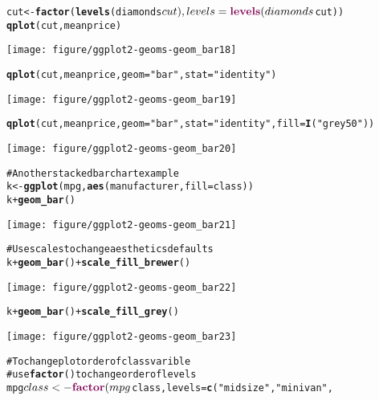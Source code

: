 \documentclass[a4paper,titlepage]{tufte-handout}\usepackage{graphicx, color}
\makeatletter
\def\maxwidth{ %
  \ifdim\Gin@nat@width>\linewidth
    \linewidth
  \else
    \Gin@nat@width
  \fi
}
\newcommand{\hlfunctioncall}[1]{\textcolor[rgb]{0.501960784313725,0,0.329411764705882}{\textbf{#1}}}%
\newcommand{\hlstring}[1]{\textcolor[rgb]{0.6,0.6,1}{#1}}%
\newcommand{\hlcomment}[1]{\textcolor[rgb]{0.180392156862745,0.6,0.341176470588235}{#1}}%
\newenvironment{kframe}{%
 \def\at@end@of@kframe{}%
 \ifinner\ifhmode%
  \def\at@end@of@kframe{\end{minipage}}%
  \begin{minipage}{\columnwidth}%
 \fi\fi%
 \def\FrameCommand##1{\hskip\@totalleftmargin \hskip-\fboxsep
 \colorbox{shadecolor}{##1}\hskip-\fboxsep
     \hskip-\linewidth \hskip-\@totalleftmargin \hskip\columnwidth}%
 \MakeFramed {\advance\hsize-\width
   \@totalleftmargin\z@ \linewidth\hsize
   \@setminipage}}%
 {\par\unskip\endMakeFramed%
 \at@end@of@kframe}
\newenvironment{knitrout}{}{} %
\makeatother
\begin{document}
\begin{knitrout}
\begin{kframe}
\begin{alltt}
cut <- \hlfunctioncall{factor}(\hlfunctioncall{levels}(diamonds$cut), levels = \hlfunctioncall{levels}(diamonds$cut))
\hlfunctioncall{qplot}(cut, meanprice)
\end{alltt}
\end{kframe}\texttt{[image: figure/ggplot2-geoms-geom\_bar18]} \begin{kframe}\begin{alltt}
\hlfunctioncall{qplot}(cut, meanprice, geom=\hlstring{"bar"}, stat=\hlstring{"identity"})
\end{alltt}
\end{kframe}\texttt{[image: figure/ggplot2-geoms-geom\_bar19]} \begin{kframe}\begin{alltt}
\hlfunctioncall{qplot}(cut, meanprice, geom=\hlstring{"bar"}, stat=\hlstring{"identity"}, fill = \hlfunctioncall{I}(\hlstring{"grey50"}))
\end{alltt}
\end{kframe}\texttt{[image: figure/ggplot2-geoms-geom\_bar20]} \begin{kframe}\begin{alltt}
\hlcomment{# Another stacked bar chart example}
k <- \hlfunctioncall{ggplot}(mpg, \hlfunctioncall{aes}(manufacturer, fill=class))
k + \hlfunctioncall{geom_bar}()
\end{alltt}
\end{kframe}\texttt{[image: figure/ggplot2-geoms-geom\_bar21]} \begin{kframe}\begin{alltt}
\hlcomment{# Use scales to change aesthetics defaults}
k + \hlfunctioncall{geom_bar}() + \hlfunctioncall{scale_fill_brewer}()
\end{alltt}
\end{kframe}\texttt{[image: figure/ggplot2-geoms-geom\_bar22]} \begin{kframe}\begin{alltt}
k + \hlfunctioncall{geom_bar}() + \hlfunctioncall{scale_fill_grey}()
\end{alltt}
\end{kframe}\texttt{[image: figure/ggplot2-geoms-geom\_bar23]} \begin{kframe}\begin{alltt}
\hlcomment{# To change plot order of class varible}
\hlcomment{# use \hlfunctioncall{factor}() to change order of levels}
mpg$class <- \hlfunctioncall{factor}(mpg$class, levels = \hlfunctioncall{c}(\hlstring{"midsize"}, \hlstring{"minivan"},

\end{alltt}
\end{kframe}
\end{knitrout}
\end{document}
